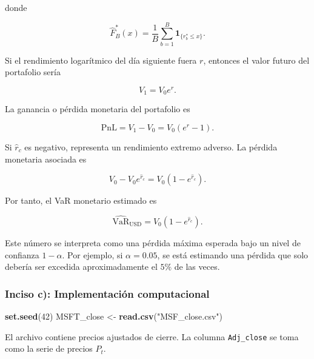 \documentclass[
]{article}
\newenvironment{Shaded}{\begin{snugshade}}{\end{snugshade}}
\newcommand{\DecValTok}[1]{\textcolor[rgb]{0.00,0.00,0.81}{#1}}
\newcommand{\FunctionTok}[1]{\textcolor[rgb]{0.13,0.29,0.53}{\textbf{#1}}}
\newcommand{\NormalTok}[1]{#1}
\newcommand{\OtherTok}[1]{\textcolor[rgb]{0.56,0.35,0.01}{#1}}
\newcommand{\StringTok}[1]{\textcolor[rgb]{0.31,0.60,0.02}{#1}}
\begin{document}
donde

\[
\widehat F_B^*(x)
=
\frac{1}{B}
\sum_{b=1}^{B}
\mathbf 1_{\{r_b^*\leq x\}}.
\]

Si el rendimiento logarítmico del día siguiente fuera \(r\), entonces el
valor futuro del portafolio sería

\[
V_1 = V_0 e^r.
\]

La ganancia o pérdida monetaria del portafolio es

\[
\text{PnL}
=
V_1 - V_0
=
V_0(e^r-1).
\]

Si \(\widehat r_c\) es negativo, representa un rendimiento extremo
adverso. La pérdida monetaria asociada es

\[
V_0 - V_0 e^{\widehat r_c}
=
V_0(1-e^{\widehat r_c}).
\]

Por tanto, el VaR monetario estimado es

\[
\widehat{\text{VaR}}_{\text{USD}}
=
V_0(1-e^{\widehat r_c}).
\]

Este número se interpreta como una pérdida máxima esperada bajo un nivel
de confianza \(1-\alpha\). Por ejemplo, si \(\alpha=0.05\), se está
estimando una pérdida que solo debería ser excedida aproximadamente el
\(5\%\) de las veces.

\subsubsection{Inciso c): Implementación
computacional}\label{inciso-c-implementaciuxf3n-computacional}

\begin{Shaded}
\begin{Highlighting}[]
\FunctionTok{set.seed}\NormalTok{(}\DecValTok{42}\NormalTok{)}
\NormalTok{MSFT\_close }\OtherTok{\textless{}{-}} \FunctionTok{read.csv}\NormalTok{(}\StringTok{"MSF\_close.csv"}\NormalTok{)}
\end{Highlighting}
\end{Shaded}

El archivo contiene precios ajustados de cierre. La columna
\texttt{Adj\_close} se toma como la serie de precios \(P_t\).
\end{document}
